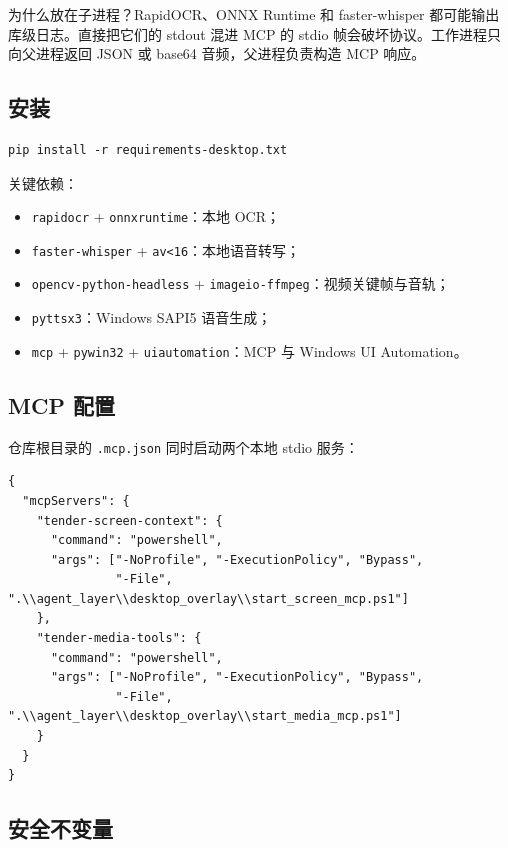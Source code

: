 \documentclass[UTF8,a4paper,11pt]{ctexart}
\begin{document}
为什么放在子进程？RapidOCR、ONNX Runtime 和 faster-whisper 都可能输出库级日志。直接把它们的 stdout 混进 MCP 的 stdio 帧会破坏协议。工作进程只向父进程返回 JSON 或 base64 音频，父进程负责构造 MCP 响应。

\subsection{安装}

\begin{verbatim}
pip install -r requirements-desktop.txt
\end{verbatim}

关键依赖：

\begin{itemize}
\item \texttt{rapidocr} + \texttt{onnxruntime}：本地 OCR；
\item \texttt{faster-whisper} + \texttt{av<16}：本地语音转写；
\item \texttt{opencv-python-headless} + \texttt{imageio-ffmpeg}：视频关键帧与音轨；
\item \texttt{pyttsx3}：Windows SAPI5 语音生成；
\item \texttt{mcp} + \texttt{pywin32} + \texttt{uiautomation}：MCP 与 Windows UI Automation。
\end{itemize}

\subsection{MCP 配置}

仓库根目录的 \texttt{.mcp.json} 同时启动两个本地 stdio 服务：

\begin{verbatim}
{
  "mcpServers": {
    "tender-screen-context": {
      "command": "powershell",
      "args": ["-NoProfile", "-ExecutionPolicy", "Bypass",
               "-File", ".\\agent_layer\\desktop_overlay\\start_screen_mcp.ps1"]
    },
    "tender-media-tools": {
      "command": "powershell",
      "args": ["-NoProfile", "-ExecutionPolicy", "Bypass",
               "-File", ".\\agent_layer\\desktop_overlay\\start_media_mcp.ps1"]
    }
  }
}
\end{verbatim}

\subsection{安全不变量}
\end{document}
